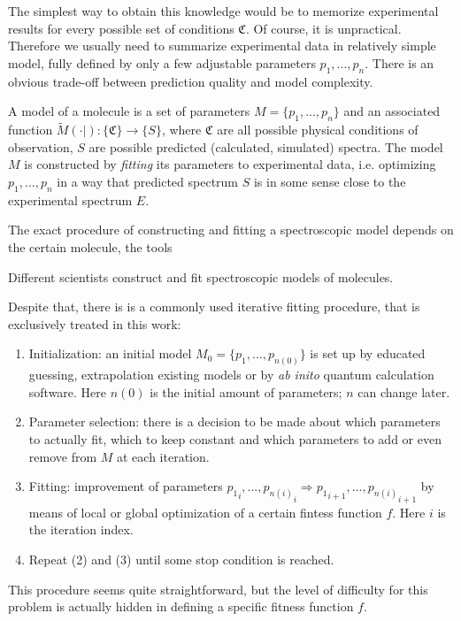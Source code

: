 \documentclass[11pt]{article}
\begin{document}
The simplest way to obtain this knowledge would be to memorize experimental results for every possible set of conditions $\mathfrak{C}$. Of course, it is unpractical. Therefore we usually need to summarize experimental data in relatively simple model, fully defined by only a few adjustable parameters $p_1, ..., p_n$. There is an obvious trade-off between prediction quality and model complexity.

A model of a molecule is a set of parameters $M = \{p_1, ..., p_n\}$ and an associated function $\tilde{M}(\cdot | ): \{\mathfrak{C}\} \rightarrow \{S\}$, where ${\mathfrak{C}}$ are all possible physical conditions of observation, ${S}$ are possible predicted (calculated, simulated) spectra. The model $M$ is constructed by \emph{fitting} its parameters to experimental data, i.e. optimizing  $p_1, ..., p_n$ in a way that predicted spectrum $S$ is in some sense close to the experimental spectrum $E$.  

The exact procedure of constructing and fitting a spectroscopic model depends on the certain molecule, the tools 

Different scientists construct and fit spectroscopic models of molecules.

Despite that, there is is a commonly used iterative fitting procedure, that is exclusively treated in this work: 

\begin{enumerate}
	\item Initialization: an initial model $M_0 = \{{p_1}, ..., {p_{n(0)}}\}$ is set up by educated guessing, extrapolation existing models or by \emph{ab inito} quantum calculation software. Here $n(0)$ is the initial amount of parameters; $n$ can change later. 
	\item Parameter selection: there is a decision to be made about which parameters to actually fit, which to keep constant and which parameters to add or even remove from $M$ at each iteration.
	\item Fitting: improvement of parameters ${p_1}_i, ..., {p_{n(i)}}_i \Rightarrow {p_1}_{i + 1}, ..., {p_{n(i)}}_{i + 1}$ by means of local or global optimization of a certain fintess function $f$. Here $i$ is the iteration index.
	\item Repeat (2) and (3) until some stop condition is reached.
	
\end{enumerate}

This procedure seems quite straightforward, but the level of difficulty for this problem is actually hidden in defining  a specific fitness function $f$. 
\end{document}
